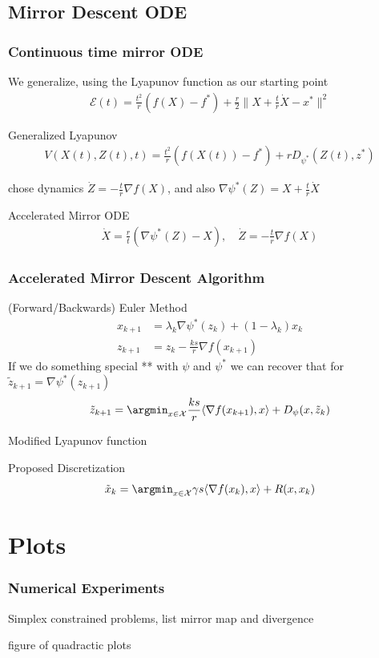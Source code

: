 \documentclass{beamer}
\begin{document}
\subsection{Mirror Descent ODE}
\begin{frame}
\frametitle{Continuous time mirror ODE}
We generalize, using the Lyapunov function as our starting point
\begin{align*}
\mathcal{E}(t) = \frac{t^2}{r} (f(X) - f^*) + \frac{r}{2} \|X+\frac{t}{r}\dot X - x^* \|^2
\end{align*}
\begin{block}{Generalized Lyapunov}
\begin{align*}
V(X(t),Z(t),t) = \frac{t^2}{r} (f(X(t)) - f^*) + r D_{\psi^*} (Z(t), z^*) 
\end{align*}
\end{block}
chose dynamics $\dot Z = -\frac{t}{r} \nabla f(X)$, and also $\nabla \psi^*(Z) = X + \frac{t}{r} \dot X$ 
\begin{block}{Accelerated Mirror ODE}
\begin{align*}
\dot X = \frac{r}{t} (\nabla \psi^*(Z) - X),\quad \dot Z = -\frac{t}{r} \nabla f(X)
\end{align*}
\end{block}
\end{frame}

\begin{frame}
\frametitle{Accelerated Mirror Descent Algorithm}
\begin{block}{(Forward/Backwards) Euler Method}
\begin{align*} x_{k+1}  &= \lambda_k \nabla \psi^*(z_k) + (1-\lambda_k) x_{k}\\
z_{k+1}& = z_k -\frac{ks}{r} \nabla f(x_{k+1}) 
\end{align*}
If we do something special ** with $\psi$ and $\psi^*$ we can recover that for $\tilde z_{k+1} = \nabla \psi^*(z_{k+1} )$
\[\tilde z_{k+1} = \argmin_{x\in\mathcal{X}} \frac{ks}{r} \langle \nabla f(x_{k+1}), x \rangle + D_\psi (x, \tilde z_k)\]
\end{block}
Modified Lyapunov function
\begin{block}{Proposed Discretization}
\[\tilde x_k = \argmin_{x\in\mathcal X} \gamma s \langle \nabla f(x_k), x \rangle + R(x,x_k) \]
\end{block}
\end{frame}

\section{Plots}
\begin{frame}
\frametitle{Numerical Experiments}
Simplex constrained problems, list mirror map and divergence

figure of quadractic plots
\end{frame}
\end{document}
